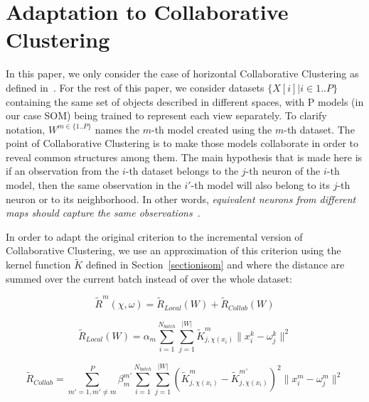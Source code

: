 	\section{Adaptation to Collaborative Clustering}
	In this paper, we only consider the case of horizontal Collaborative Clustering as defined in~\cite{ghassany2012collaborative}. For the rest of this paper, we consider datasets $\{X[i] | i \in 1..P\}$ containing the same set of objects described in different spaces, with P models (in our case SOM) being trained to represent each view separately. To clarify notation, $W^{m \in \{1..P\}}$ names the $m$-th model created using the $m$-th dataset. The point of Collaborative Clustering is to make those models collaborate in order to reveal common structures among them. The main hypothesis that is made here is if an observation from the $i$-th dataset belongs to the $j$-th neuron of the $i$-th model, then the same observation in the $i'$-th model will also belong to its $j$-th neuron or to its neighborhood. In other words, \textit{equivalent neurons from different maps should capture the same observations}~\cite{ghassany2012collaborative}.
		
	In order to adapt the original criterion to the incremental version of Collaborative Clustering, we use an approximation of this criterion using the kernel function $\widetilde{K}$ defined in Section~\ref{sectionisom} and where the distance are summed over the current batch instead of over the whole dataset:
	
		\begin{equation}
\label{criterion}
		\widetilde{R}^m(\chi, \omega) = \widetilde{R}_{Local}(W) + \widetilde{R}_{Collab}(W)
		\end{equation}
		
		\begin{equation}
\label{criterion2}
		\widetilde{R}_{Local}(W) = \alpha_m\sum_{i=1}^{N_{batch}}\sum_{j=1}^{|W|}\widetilde{K}^m_{j, \chi(x_i)}\|x_i^k - \omega_j^k\|^2
		\end{equation}
		
		\begin{equation}
        \widetilde{R}_{Collab} = \sum_{m'=1, m'\neq m}^{P}\beta_m^{m'}\sum_{i=1}^{N_{batch}}\sum_{j=1}^{|W|}{(\widetilde{K}^m_{j, \chi(x_i)} - \widetilde{K}^{m'}_{j, \chi(x_i)})}^2  \|x_i^m - \omega_j^m\|^2
		\end{equation}
		
